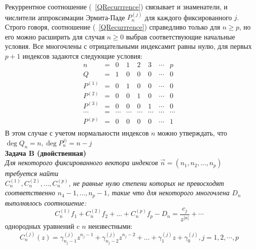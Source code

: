 Рекуррентное соотношение (~\ref{QRecurrrence}) связывает и
знаменатели, и числители аппроксимации Эрмита-Паде $P^{(j)}_n$
для каждого фиксированного $j$. Строго говоря, соотношение
(~\ref{QRecurrrence}) справедливо только для $n\geq{p}$, но его
можно расширить для случая $n\geq{0}$ выбрав соответствующие
начальные условия. Все многочлены с отрицательными индексамит
равны нулю, для первых $p+1$ индексов задаются следующие условия:
$$
\begin{array} {rcccccccccccccc}
n       & = & 0 & 1 & 2 & 3 & \cdots & p   \\
Q       & = & 1 & 0 & 0 & 0 & \cdots & 0    \\
P^{(1)} & = & 0 & 1 & 0 & 0 & \cdots & 0    \\
P^{(2)} & = & 0 & 0 & 1 & 0 & \cdots & 0    \\
P^{(3)} & = & 0 & 0 & 0 & 1 & \cdots & 0    \\
\cdots  & = & \cdots & \cdots & \cdots & \cdots & \cdots & \cdots   \\
P^{(p)} & = & 0 & 0 & 0 & 0 & \cdots & 1    \\
\end{array}
$$
В этом случае с учетом нормальности индексов $n$ можно утверждать, что $\deg Q_n=n, \deg P_n^{j)} = n-j$ \\
\textbf{Задача B (двойственная)} \\ \textit{Для некоторого фиксированного
вектора индексов
$\overrightarrow{n}=(n_1,n_2,\ldots,n_p)$ требуется найти \\
$C^{(1)}_n,C^{(2)}_n,\ldots,C^{(p)}_n$, не равные нулю степени
которых не превосходят соответственно $n_4-1,\ldots, n_p-1$, такие
что для некоторого многочлена $D_n$ выполнялось соотношение:}
$$%
C^{(1)}_nf_1+C^{(2)}_nf_2+\ldots+C^{(p)}_nf_p-D_n=\frac{c_j}{z^{|n|}}+\cdots
$$%
однородных уравнений c $n$ неизвестными:
\begin{equation}
\label{CH0}
C_n^{(j)}(z)=\gamma^{(j)}_{n_j-1}z^{n_j-1}+\gamma^{(j)}_{n_j-2}z^{n_j-2}+\ldots+\gamma^{(j)}_{1}z+\gamma^{(j)}_{0},
j=1,2,\cdots,p
\end{equation}
